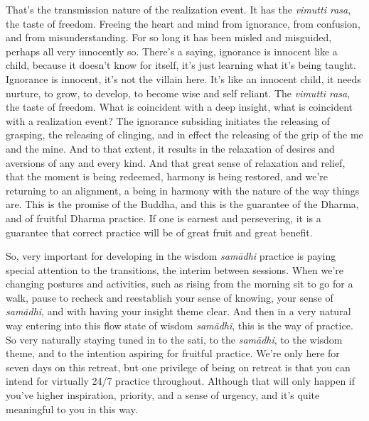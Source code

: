 \documentclass[12pt,openany]{book}
\begin{document}
That's the transmission nature of the realization event. It has the \textit{vi\-mut\-ti ra\-sa}, the taste of freedom. Freeing the heart and mind from ignorance, from confusion, and from misunderstanding. \linebreak For so long it has been misled and misguided, perhaps all very innocently so. There’s a saying, ignorance is innocent like a child, because it doesn't know for itself, it's just learning what it’s being taught. Ignorance is innocent, it’s not the villain here. It’s like an innocent child, it needs nurture, to grow, to develop, to become wise and self reliant. The \textit{vi\-mut\-ti ra\-sa}, the taste of freedom. What is coincident with a deep insight, what is coincident with a realization event? The ignorance subsiding initiates the releasing of grasping, the releasing of clinging, and in effect the releasing of the grip of the me and the mine. And to that extent, it results in the relaxation of desires and aversions of any and every kind. And that great sense of relaxation and relief, that the moment is being redeemed, harmony is being restored, and we’re returning to an alignment, a being in harmony with the nature of the way things are. This is the promise of the Buddha, and this is the guarantee of the Dhar\-ma, and of fruitful Dhar\-ma practice. If one is earnest and persevering, it is a guarantee that correct practice will be of great fruit and great benefit.

So, very important for developing in the wisdom \textit{samādhi} practice is paying special attention to the transitions, the interim between sessions. When we’re changing postures and activities, \linebreak such as rising from the morning sit to go for a walk, pause to recheck and reestablish your sense of knowing, your sense of \textit{sa\-mā\-dhi}, and with having your insight theme clear. And then in a very natural way entering into this flow state of wisdom \textit{samādhi}, this is the way of practice. So very naturally staying tuned in to the sati, to the \textit{samādhi}, to the wisdom theme, and to the intention aspiring for fruitful practice. We’re only here for seven days on this retreat, but one privilege of being on retreat is that you can intend for virtually 24/7 practice throughout. Although that will only happen if you've higher inspiration, priority, and a sense of urgency, and it’s quite meaningful to you in this way.
\end{document}
